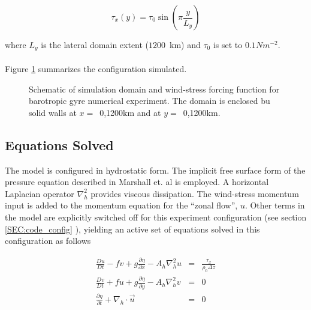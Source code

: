 \begin{equation}
\label{EQ:eg-baro-taux}
\tau_x(y) = \tau_{0}\sin(\pi \frac{y}{L_y})
\end{equation}
 
\noindent where $L_{y}$ is the lateral domain extent ($1200$~km) and 
$\tau_0$ is set to $0.1N m^{-2}$. 
\\
\\
Figure \ref{FIG:eg-baro-simulation_config}
summarizes the configuration simulated.

\begin{figure}
\centerline{
}
\caption{Schematic of simulation domain and wind-stress forcing function 
for barotropic gyre numerical experiment. The domain is enclosed bu solid
walls at $x=$~0,1200km and at $y=$~0,1200km.}
\label{FIG:eg-baro-simulation_config}
\end{figure}

\subsection{Equations Solved}
\label{www:tutorials}
The model is configured in hydrostatic form. The implicit free surface form of the
pressure equation described in Marshall et. al \cite{marshall:97a} is
employed.
A horizontal Laplacian operator $\nabla_{h}^2$ provides viscous
dissipation. The wind-stress momentum input is added to the momentum equation
for the ``zonal flow'', $u$. Other terms in the model
are explicitly switched off for this experiment configuration (see section
\ref{SEC:code_config} ), yielding an active set of equations solved in this
configuration as follows 

\begin{eqnarray}
\label{EQ:eg-baro-model_equations}
\frac{Du}{Dt} - fv +
              g\frac{\partial \eta}{\partial x} -
              A_{h}\nabla_{h}^2u
& = &
\frac{\tau_{x}}{\rho_{0}\Delta z}
\\
\frac{Dv}{Dt} + fu + g\frac{\partial \eta}{\partial y} -
              A_{h}\nabla_{h}^2v
& = &
0
\\
\frac{\partial \eta}{\partial t} + \nabla_{h}\cdot \vec{u}
&=&
0
\end{eqnarray}

